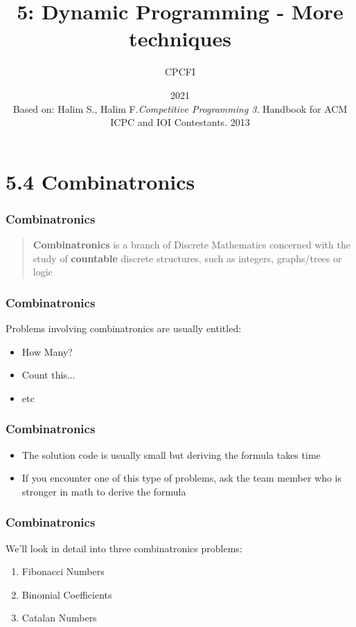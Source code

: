 \documentclass{beamer}
\title{5: Dynamic Programming - More techniques}
\author{CPCFI}
\institute{UNAM's School of Engineering}
\date{2021 \\ \vspace{0.5cm} \scriptsize{Based on: Halim S., Halim F.\textit{Competitive Programming 3}}. Handbook for ACM ICPC and IOI Contestants. 2013}
\begin{document}
\frame{\titlepage}


\section{5.4 Combinatronics}

\begin{frame}[fragile]
\frametitle{Combinatronics}

\begin{quote}
    \textbf{Combinatronics} is a branch of Discrete Mathematics concerned with the study of \textbf{countable} discrete structures, such as integers, graphs/trees or logic
\end{quote}

\end{frame}

\begin{frame}[fragile]
\frametitle{Combinatronics}

Problems involving combinatronics are usually entitled:

\begin{itemize}
    \item How Many?
    \item Count this...
    \item etc
\end{itemize}

\end{frame}

\begin{frame}[fragile]
\frametitle{Combinatronics}

\begin{itemize}
    \item The solution code is usually small but deriving the formula takes time
    \item If you encounter one of this type of problems, ask the team member who is stronger in math to derive the formula
\end{itemize}

\end{frame}

\begin{frame}[fragile]
\frametitle{Combinatronics}

We'll look in detail into three combinatronics problems:

\begin{enumerate}
    \item Fibonacci Numbers
    \item Binomial Coefficients
    \item Catalan Numbers
\end{enumerate}

\end{frame}
\end{document}

